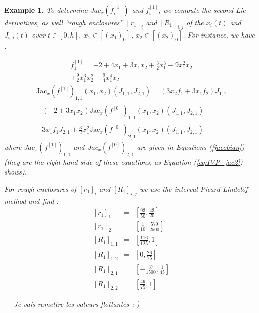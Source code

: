 \documentclass{sig-alternate-05-2015} %
\newcommand\ForAuthors[1]%
 {\par\smallskip                     %
  \begin{center}%
   \fbox%
   {\parbox{0.9\linewidth}%
    {\raggedright\sc--- #1}%
   }%
  \end{center}%
  \par\smallskip                     %
 }
\newtheorem{example}{Example}
\def\int#1{\mbox{$[ #1 ]$}}
\begin{document}
\begin{example}
To determine $Jac_x(f_i^{[1]})$ and $f_i^{[1]}$, we compute the second Lie derivatives, as well ``rough enclosures''
$\int{r_1}_i$ and $\int{R_1}_{i,j}$ of the $x_i(t)$ and $J_{i,j}(t)$ over $t\in [0,h]$, 
$x_1 \in \int{(x_1)_0}$, $x_2 \in \int{(x_2)_0}$. For instance, we have : 

\begin{multline}
{f}_1^{[1]} = -2+4x_1+3x_1x_2+\frac{3}{2}x_1^3-9x_1^2x_2\\
+\frac{9}{2}x_1^3x_2^2-\frac{9}{4}x_1^4x_2
\end{multline}
\begin{multline}
\mbox{Jac}_x(f^{[1]})_{1,1}(x_1,x_2)(J_{1,1},J_{2,1}) = (3x_2f_1+3x_1f_2)J_{1,1}\\
+(-2+3x_1x_2)\mbox{Jac}_x(f^{[0]})_{1,1}(x_1,x_2)(J_{1,1},J_{2,1}) \\ 
+3x_1f_1J_{2,1}+\frac{3}{2}x_1^2{\mbox{Jac}_x(f^{[0]})}_{2,1}(x_1,x_2)(J_{1,1},J_{2,1}) 
\label{secondderivative}
\end{multline} %
\noindent where $Jac_x(f^{[1]})_{1,1}$ %
and ${Jac_x(f^{[0]})}_{2,1}$ %
are given in Equations (\ref{jacobian}) (they are the right hand side
of these equations, as Equation (\ref{eq:IVP_jac2}) shows). 

For rough enclosures of $\int{r_1}_i$ and $\int{R_1}_{i,j}$ we use the interval Picard-Lindel\"of method and find : 
\begin{eqnarray}%
\int{r_1}_1 & = & \left[\frac{93}{50}, \frac{43}{20}\right]\\
\int{r_1}_2 & = & \left[\frac{1}{10}, \frac{579}{2500}\right]\\
\int{R_1}_{1,1} & = & \left[\frac{116}{125}, 1\right]\\
\int{R_1}_{1,2} & = & \left[0, \frac{26}{75}\right]\\
\int{R_1}_{2,1} & = & \left[-\frac{37}{1500}, \frac{1}{45}\right]\\
\int{R_1}_{2,2} & = & \left[\frac{49}{75}, 1\right]
\label{roughenclosures}
\end{eqnarray}%
\ForAuthors{Je vais remettre les valeurs flottantes ;-)}
\end{example}
\end{document}
